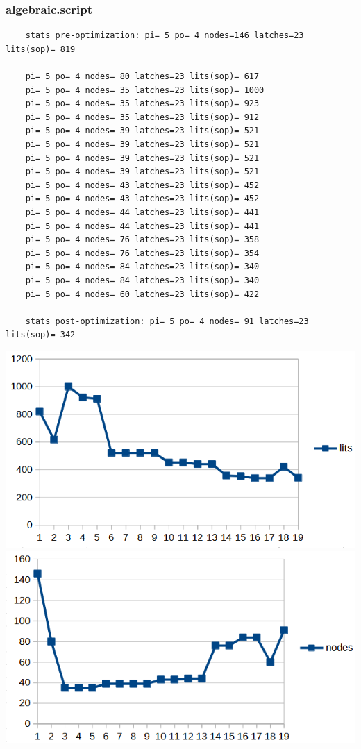 \documentclass[a4paper,11pt]{article}
\begin{document}
\subsubsection{algebraic.script}
    \begin{verbatim}
    stats pre-optimization: pi= 5 po= 4 nodes=146 latches=23 lits(sop)= 819
    
    pi= 5 po= 4 nodes= 80 latches=23 lits(sop)= 617
    pi= 5 po= 4 nodes= 35 latches=23 lits(sop)= 1000
    pi= 5 po= 4 nodes= 35 latches=23 lits(sop)= 923
    pi= 5 po= 4 nodes= 35 latches=23 lits(sop)= 912
    pi= 5 po= 4 nodes= 39 latches=23 lits(sop)= 521
    pi= 5 po= 4 nodes= 39 latches=23 lits(sop)= 521
    pi= 5 po= 4 nodes= 39 latches=23 lits(sop)= 521
    pi= 5 po= 4 nodes= 39 latches=23 lits(sop)= 521
    pi= 5 po= 4 nodes= 43 latches=23 lits(sop)= 452
    pi= 5 po= 4 nodes= 43 latches=23 lits(sop)= 452
    pi= 5 po= 4 nodes= 44 latches=23 lits(sop)= 441
    pi= 5 po= 4 nodes= 44 latches=23 lits(sop)= 441
    pi= 5 po= 4 nodes= 76 latches=23 lits(sop)= 358
    pi= 5 po= 4 nodes= 76 latches=23 lits(sop)= 354
    pi= 5 po= 4 nodes= 84 latches=23 lits(sop)= 340
    pi= 5 po= 4 nodes= 84 latches=23 lits(sop)= 340
    pi= 5 po= 4 nodes= 60 latches=23 lits(sop)= 422
    
    stats post-optimization: pi= 5 po= 4 nodes= 91 latches=23 lits(sop)= 342
    \end{verbatim}
    \begin{center}
        \includegraphics[width=0.5\linewidth]{assets/Charts/AlgebraicL.png}
        \includegraphics[width=0.5\linewidth]{assets/Charts/AlgebraicN.png}
    \end{center}

\newpage
\end{document}
